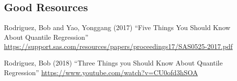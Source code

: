 \documentclass[12pt]{../notes}
\begin{document}
\subsection{Good Resources}
\bi
\item Rodriguez, Bob and Yao, Yonggang (2017) “Five Things You Should Know About Quantile Regression” \url{https://support.sas.com/resources/papers/proceedings17/SAS0525-2017.pdf} 
\item Rodriguez, Bob (2018) “Three Things you Should Know About Quantile Regression” \url{https://www.youtube.com/watch?v=CU0ofd3hSOA} 
\ei
\end{document}
